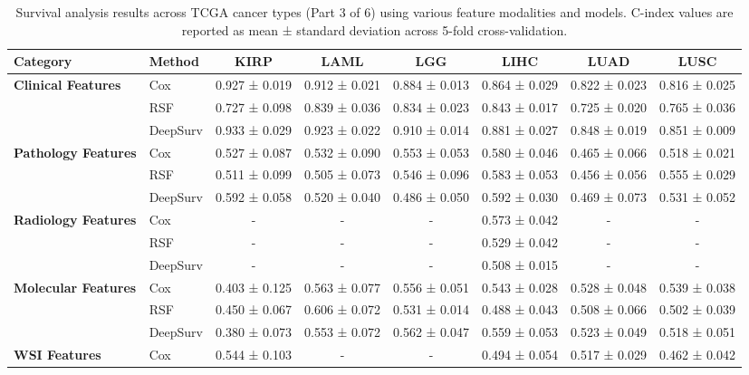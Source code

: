 \begin{sidewaystable}[htbp]
    \centering
    \caption{Survival analysis results across TCGA cancer types (Part 3 of 6) using various feature modalities and models. C-index values are reported as mean ± standard deviation across 5-fold cross-validation.}
    \label{tab:survival_results_3}
    \begin{tabular}{@{}llcccccc@{}}
        \toprule
        \textbf{Category} & \textbf{Method} & \textbf{KIRP} & \textbf{LAML} & \textbf{LGG} & \textbf{LIHC} & \textbf{LUAD} & \textbf{LUSC} \\
        \midrule
        \multirow{3}{*}{\textbf{Clinical Features}} & Cox & 0.927 ± 0.019 & 0.912 ± 0.021 & 0.884 ± 0.013 & 0.864 ± 0.029 & 0.822 ± 0.023 & 0.816 ± 0.025 \\
        & RSF & 0.727 ± 0.098 & 0.839 ± 0.036 & 0.834 ± 0.023 & 0.843 ± 0.017 & 0.725 ± 0.020 & 0.765 ± 0.036 \\
        & DeepSurv & 0.933 ± 0.029 & 0.923 ± 0.022 & 0.910 ± 0.014 & 0.881 ± 0.027 & 0.848 ± 0.019 & 0.851 ± 0.009 \\
        \midrule
        \multirow{3}{*}{\textbf{Pathology Features}} & Cox & 0.527 ± 0.087 & 0.532 ± 0.090 & 0.553 ± 0.053 & 0.580 ± 0.046 & 0.465 ± 0.066 & 0.518 ± 0.021 \\
        & RSF & 0.511 ± 0.099 & 0.505 ± 0.073 & 0.546 ± 0.096 & 0.583 ± 0.053 & 0.456 ± 0.056 & 0.555 ± 0.029 \\
        & DeepSurv & 0.592 ± 0.058 & 0.520 ± 0.040 & 0.486 ± 0.050 & 0.592 ± 0.030 & 0.469 ± 0.073 & 0.531 ± 0.052 \\
        \midrule
        \multirow{3}{*}{\textbf{Radiology Features}} & Cox & - & - & - & 0.573 ± 0.042 & - & - \\
        & RSF & - & - & - & 0.529 ± 0.042 & - & - \\
        & DeepSurv & - & - & - & 0.508 ± 0.015 & - & - \\
        \midrule
        \multirow{3}{*}{\textbf{Molecular Features}} & Cox & 0.403 ± 0.125 & 0.563 ± 0.077 & 0.556 ± 0.051 & 0.543 ± 0.028 & 0.528 ± 0.048 & 0.539 ± 0.038 \\
        & RSF & 0.450 ± 0.067 & 0.606 ± 0.072 & 0.531 ± 0.014 & 0.488 ± 0.043 & 0.508 ± 0.066 & 0.502 ± 0.039 \\
        & DeepSurv & 0.380 ± 0.073 & 0.553 ± 0.072 & 0.562 ± 0.047 & 0.559 ± 0.053 & 0.523 ± 0.049 & 0.518 ± 0.051 \\
        \midrule
        \multirow{3}{*}{\textbf{WSI Features}} & Cox & 0.544 ± 0.103 & - & - & 0.494 ± 0.054 & 0.517 ± 0.029 & 0.462 ± 0.042 \\

\end{tabular}
\end{sidewaystable}
